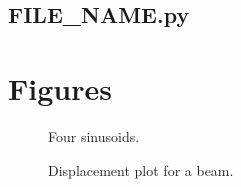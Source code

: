 \documentclass{article}
\begin{document}
\lstset{style=python103, language=python} 


\subsection{FILE\_NAME.py}
%

\clearpage %

\section{Figures}
\begin{figure}[ht!]
\begin{center}
\caption{Four sinusoids.}
\end{center}
\end{figure}

\begin{figure}[ht!]
\begin{center}
\caption{Displacement plot for a beam.}
\end{center}
\end{figure}
\end{document}
